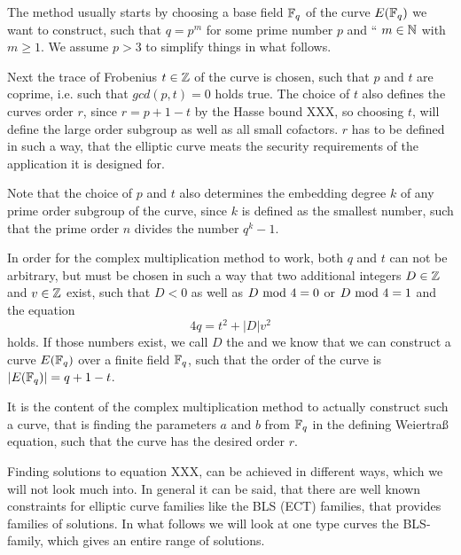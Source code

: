 
The method usually starts by choosing a base field $\mathbb{F}_{q}$ of the curve $E(\mathbb{F}_q)$ we want to construct, such that $q = p^m$ for some prime number $p$ and  `` $m\in \mathbb{N}$ with $m\geq 1$. We assume $p>3$ to simplify things in what follows. 

Next the trace of Frobenius $t\in \mathbb{Z}$ of the curve is chosen, such that $p$ and $t$ are coprime, i.e. such that $gcd(p,t)=0$ holds true. The choice of $t$ also defines the curves order $r$, since $r=p+1-t$ by the Hasse bound XXX, so choosing $t$, will define the large order subgroup as well as all small cofactors. $r$ has to be defined in such a way, that the elliptic curve meats the security requirements of the application it is designed for. 

Note that the choice of $p$ and $t$ also determines the embedding degree $k$ of any prime order subgroup of the curve, since $k$ is defined as the smallest number, such that the prime order $n$ divides the number $q^k-1$.

In order for the complex multiplication method to work, both $q$ and $t$ can not be arbitrary, but must be chosen in such a way that two additional integers $D\in \mathbb{Z}$ and $v\in \mathbb{Z}$ exist, such that $D<0$ as well as $D \text{ mod } 4=0$ or $D \text{ mod } 4=1$ and the equation
\begin{equation}
     4q  = t^2 + |D|v^2 
\end{equation}
holds. If those numbers exist, we call $D$ the  and we know that we can construct a curve $E(\mathbb{F}_q)$ over a finite field $\mathbb{F}_q$, such that the order of the curve is $|E(\mathbb{F}_q)|= q+1-t$. 

It is the content of the complex multiplication method to actually construct such a curve, that is finding the parameters $a$ and $b$ from $\mathbb{F}_q$ in the defining Weiertraß equation, such that the curve has the desired order $r$. 

Finding solutions to equation XXX, can be achieved in different ways, which we will not look much into. In general it can be said, that there are well known constraints for elliptic curve families like the BLS (ECT) families, that provides families of solutions. In what follows we will look at one type curves the BLS-family, which gives an entire range of solutions.

